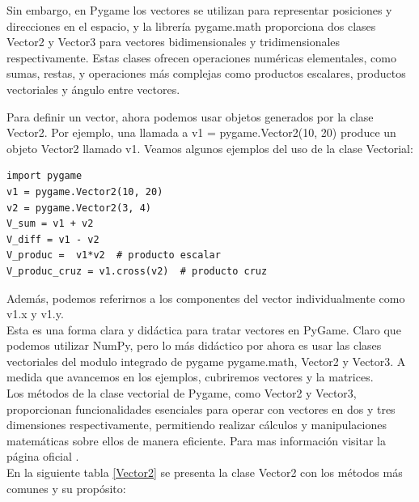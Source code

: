 {Sin embargo, en Pygame los vectores se utilizan para representar posiciones y direcciones en el espacio, y la librería  {\ttfamily pygame.math} proporciona dos clases  {\ttfamily Vector2} y {\ttfamily Vector3} para vectores bidimensionales y tridimensionales respectivamente. Estas clases ofrecen operaciones numéricas elementales, como sumas, restas, y operaciones más complejas como productos escalares, productos vectoriales y ángulo entre vectores. 

Para definir un vector, ahora podemos usar objetos generados por la clase {\ttfamily Vector2}. Por ejemplo, una llamada a 
{\ttfamily v1 = pygame.Vector2(10, 20)} produce un objeto Vector2 llamado {\ttfamily v1}.  Veamos algunos ejemplos del uso de la clase Vectorial:
\begin{lstlisting}
import pygame
v1 = pygame.Vector2(10, 20)
v2 = pygame.Vector2(3, 4)
V_sum = v1 + v2
V_diff = v1 - v2
V_produc =  v1*v2  # producto escalar
V_produc_cruz = v1.cross(v2)  # producto cruz
\end{lstlisting}
Además, podemos referirnos a los componentes del vector individualmente como {\ttfamily v1.x} y {\ttfamily v1.y}. \\

Esta es una forma clara y didáctica para tratar vectores en PyGame.  Claro que podemos utilizar {\ttfamily NumPy}, pero lo más didáctico por ahora es usar las clases vectoriales del modulo integrado de pygame  {\ttfamily pygame.math}, {\ttfamily Vector2} y {\ttfamily Vector3}.  
A medida que avancemos en los ejemplos, cubriremos  vectores y la matrices.\\


Los métodos de la clase vectorial de Pygame, como Vector2 y Vector3, proporcionan funcionalidades esenciales 
para operar con vectores en dos y tres dimensiones respectivamente, permitiendo realizar cálculos y manipulaciones 
matemáticas sobre ellos de manera eficiente. Para mas información visitar la página oficial  {\scriptsize
\href{https://www.pygame.org/docs/ref/math.html#pygame.math.Vector3.as_polar}{}}.\\
 
En la siguiente tabla \ref{Vector2} se presenta la clase {\ttfamily Vector2}  con los métodos  más comunes y su propósito:\\ 


}
